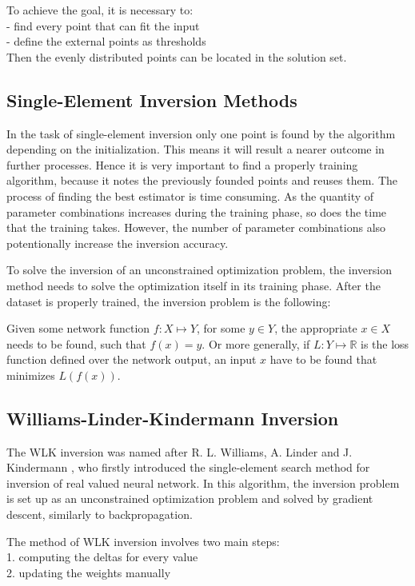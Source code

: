 \noindent To achieve the goal, it is necessary to:\\
- find every point that can fit the input\\
- define the external points as thresholds\\
Then the evenly distributed points can be located in the solution set.



\subsection{Single-Element Inversion Methods}

In the task of single-element inversion only one point is found by the algorithm depending on the initialization. This means it will result a nearer outcome in further processes. Hence it is very important to find a properly training algorithm, because it notes the previously founded points and reuses them. The process of finding the best estimator is time consuming. As the quantity of parameter combinations increases during the training phase, so does the time that the training takes. However, the number of parameter combinations also potentionally increase the inversion accuracy.\bigskip

To solve the inversion of an unconstrained optimization problem, the inversion method needs to solve the optimization itself in its training phase. After the dataset is properly trained, the inversion problem is the following:\medskip

Given some network function $f : X \mapsto Y$, for some $y \in Y$, the appropriate $x \in X$ needs to be found, such that $f(x) = y$. Or more generally, if $L : Y \mapsto \mathbb{R}$ is the loss function defined over the network output, an input $x$ have to be found that minimizes $L(f(x))$. 


\subsection{Williams-Linder-Kindermann Inversion}

\label{para:wlk-inv}The WLK inversion was named after R. L. Williams, A. Linder and J. Kindermann \cite{KINDERMANN1990277}, who firstly introduced the single-element search method for inversion of real valued neural network. In this algorithm, the inversion problem is set up as an unconstrained optimization problem and solved by gradient descent, similarly to backpropagation. \medskip

\noindent The method of WLK inversion involves two main steps: \\
1. computing the deltas for every value \\
2. updating the weights manually\medskip

